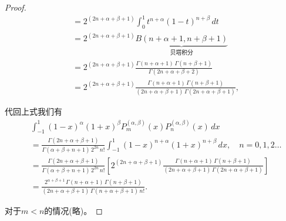 \begin{subappendices}
\begin{proof}
\begin{equation*}
\begin{split}
    &= 2^{(2n + \alpha + \beta + 1)} \int_{0}^{1} t^{n+\alpha} (1-t)^{n+\beta} \, dt \\
    &= 2^{(2n + \alpha + \beta + 1)} \underbrace{B(n+\alpha+1, n+\beta+1)}_{贝塔积分} \\
    &= 2^{(2n + \alpha + \beta + 1)} \frac{
    \Gamma (n+\alpha + 1) \, \Gamma(n+\beta+1)
    }{
    \Gamma (2n + \alpha + \beta + 2)
    } \\
    &= 2^{(2n + \alpha + \beta + 1)}  \frac{
    \Gamma (n+\alpha + 1) \, \Gamma(n+\beta+1)
    }{
    (2n + \alpha + \beta + 1) \, \Gamma (2n + \alpha + \beta + 1)
    },
  \end{split}
\end{equation*}

代回上式我们有
\begin{equation*}
  \begin{split}
    &\int_{-1}^{1} (1-x)^{\alpha} (1+x)^{\beta} P_m^{(\alpha,\beta)}(x) P_n^{(\alpha,\beta)}(x) \, dx \\
    &=\frac{
    \Gamma(2n+\alpha+\beta+1)
    }{
    \Gamma(\alpha + \beta + n + 1) \, 2^{2n}  \, n!
    }
    \int_{-1}^{1} (1-x)^{n+\alpha} (1+x)^{n+\beta} \, dx, \quad n=0,1,2 \ldots \\
    &= \frac{
    \Gamma(2n+\alpha+\beta+1)
    }{
    \Gamma(\alpha + \beta + n + 1) \, 2^{2n}  \, n!
    } \left[ 2^{(2n + \alpha + \beta + 1)}  \frac{
    \Gamma (n+\alpha + 1) \, \Gamma(n+\beta+1)
    }{
    (2n + \alpha + \beta + 1) \, \Gamma (2n + \alpha + \beta + 1)
    } \right] \\
    &= \frac{
      2^{\alpha + \beta + 1} \, \Gamma(n+\alpha+1) \, \Gamma (n + \beta + 1)
      }{
      \left( 2n + \alpha + \beta + 1 \right) \, \Gamma(n+\alpha+\beta+1) \, n!
      }.
  \end{split}
\end{equation*}

对于$m<n$的情况(略)。
\end{proof}


\end{subappendices}
